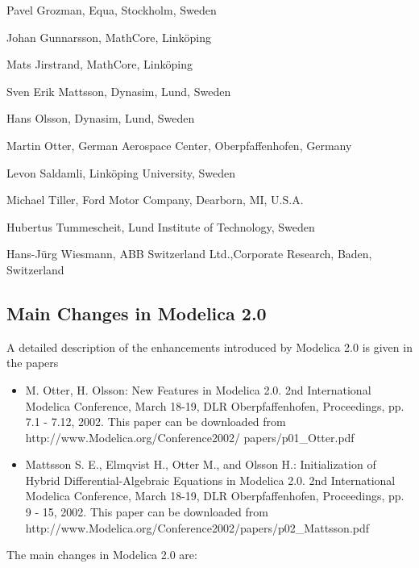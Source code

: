 \documentclass[10pt,a4paper]{report}
\def\doublelabel#1{\label{#1}\hypertarget{#1}{}}
\begin{document}
Pavel Grozman, Equa, Stockholm, Sweden

Johan Gunnarsson, MathCore, Linköping

Mats Jirstrand, MathCore, Linköping

Sven Erik Mattsson, Dynasim, Lund, Sweden

Hans Olsson, Dynasim, Lund, Sweden

Martin Otter, German Aerospace Center, Oberpfaffenhofen, Germany

Levon Saldamli, Linköping University, Sweden

Michael Tiller, Ford Motor Company, Dearborn, MI, U.S.A.

Hubertus Tummescheit, Lund Institute of Technology, Sweden

Hans-Jürg Wiesmann, ABB Switzerland Ltd.,Corporate Research, Baden,
Switzerland

\subsection{Main Changes in Modelica 2.0}\doublelabel{main-changes-in-modelica-2-0}

A detailed description of the enhancements introduced by Modelica 2.0 is
given in the papers

\begin{itemize}
\item
  M. Otter, H. Olsson: New Features in Modelica 2.0. 2nd International
  Modelica Conference, March 18-19, DLR Oberpfaffenhofen, Proceedings,
  pp. 7.1 - 7.12, 2002. This paper can be downloaded from
  http://www.Modelica.org/Conference2002/ papers/p01\_Otter.pdf
\item
  Mattsson S. E., Elmqvist H., Otter M., and Olsson H.: Initialization
  of Hybrid Differential-Algebraic Equations in Modelica 2.0. 2nd
  International Modelica Conference, March 18-19, DLR Oberpfaffenhofen,
  Proceedings, pp. 9 - 15, 2002. This paper can be downloaded from
  http://www.Modelica.org/Conference2002/papers/p02\_Mattsson.pdf
\end{itemize}

The main changes in Modelica 2.0 are:
\end{document}
